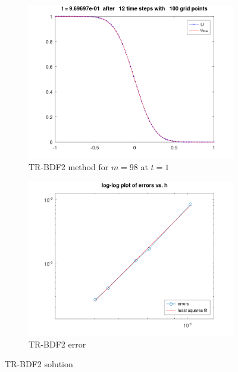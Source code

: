 \begin{solution}
    \begin{figure}[h]
        \centering
        \begin{subfigure}[b]{0.425\textwidth}
            \centering
            \includegraphics[width=\textwidth]{problem_3b_heatTRBDF2_t-12.png}
            \caption{TR-BDF2 method for $m = 98$ at $t = 1$}
        \end{subfigure}
        \hfill
        \begin{subfigure}[b]{0.4\textwidth}
            \centering
            \includegraphics[width=\textwidth]{problem_3b_heatTRBDF2_error.png}
            \caption{TR-BDF2 error}
        \end{subfigure}
        \caption[]{TR-BDF2 solution}
    \end{figure}


\end{solution}
